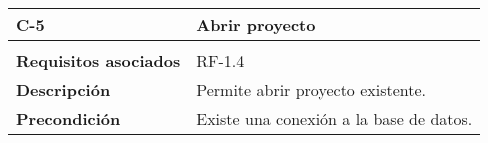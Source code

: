\begin{longtable}[H]{@{}ll@{}}
\toprule
\begin{minipage}[b]{0.23\columnwidth}\raggedright\strut
\textbf{C-5}\strut
\end{minipage} & \begin{minipage}[b]{0.71\columnwidth}\raggedright\strut
\textbf{Abrir proyecto}\strut
\end{minipage}\tabularnewline
\midrule
\endhead
\tabularnewline
\begin{minipage}[t]{0.23\columnwidth}\raggedright\strut
\textbf{Requisitos asociados}\strut
\end{minipage} & \begin{minipage}[t]{0.71\columnwidth}\raggedright\strut
RF-1.4\strut
\end{minipage}\tabularnewline
\begin{minipage}[t]{0.23\columnwidth}\raggedright\strut
\textbf{Descripción}\strut
\end{minipage} & \begin{minipage}[t]{0.71\columnwidth}\raggedright\strut
Permite abrir proyecto existente.\strut
\end{minipage}\tabularnewline
\begin{minipage}[t]{0.23\columnwidth}\raggedright\strut
\textbf{Precondición}\strut
\end{minipage} & \begin{minipage}[t]{0.71\columnwidth}\raggedright\strut
Existe una conexión a la base de datos.


\end{minipage}
\end{longtable}
